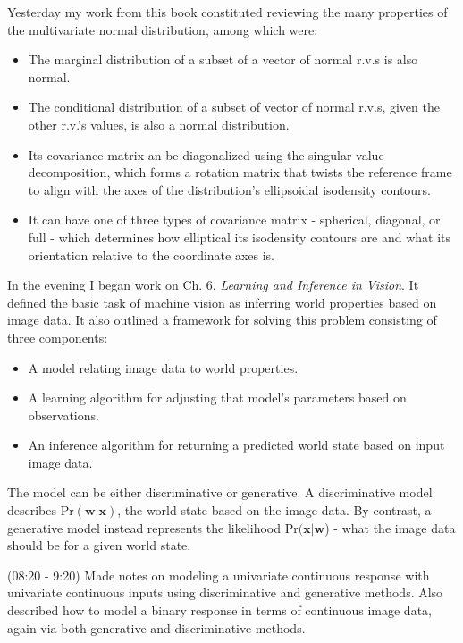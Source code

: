 \documentclass[idxtotoc,hyperref,openany]{labbook} %
\begin{document}
Yesterday my work from this book constituted reviewing the many properties of the multivariate normal distribution, among which were:
\begin{itemize}
	\item The marginal distribution of a subset of a vector of normal r.v.s is also normal.
	\item The conditional distribution of a subset of vector of normal r.v.s, given the other r.v.'s values, is also a normal distribution.
	\item Its covariance matrix an be diagonalized using the singular value decomposition, which forms a rotation matrix that twists the reference frame to align with the axes of the distribution's ellipsoidal isodensity contours.
	\item It can have one of three types of covariance matrix - spherical, diagonal, or full - which determines how elliptical its isodensity contours are and what its orientation relative to the coordinate axes is.
\end{itemize}
In the evening I began work on Ch. 6, \emph{Learning and Inference in Vision}. It defined the basic task of machine vision as inferring world properties based on image data. It also outlined a framework for solving this problem consisting of three components:
\begin{itemize}
	\item A model relating image data to world properties.
	\item A learning algorithm for adjusting that model's parameters based on observations.
	\item An inference algorithm for returning a predicted world state based on input image data.
\end{itemize}
The model can be either discriminative or generative. A discriminative model describes $\text{Pr}(\mathbf{w}|\mathbf{x})$, the world state based on the image data. By contrast, a generative model instead represents the likelihood $\text{Pr}(\mathbf{x}|\mathbf{w}$) - what the image data should be for a given world state.

(08:20 - 9:20) Made notes on modeling a univariate continuous response with univariate continuous inputs using discriminative and generative methods. Also described how to model a binary response in terms of continuous image data, again via both generative and discriminative methods. 
 
\end{document}
